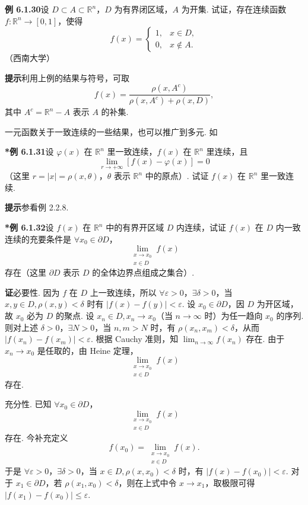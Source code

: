 \documentclass[UTF8,12pt,a4paper,fontset=fandol]{ctexart}
\begin{document}
\noindent\textbf{例 6.1.30}\quad 设 $D\subset A\subset\mathbb{R}^n$，$D$ 为有界闭区域，$A$ 为开集. 试证，存在连续函数 $f:\mathbb{R}^n\to[0,1]$，使得
\[
  f(x)=
  \begin{cases}
  1, & x\in D,\\
  0, & x\notin A.
  \end{cases}
\]
（西南大学）

\noindent\textbf{提示}\quad 利用上例的结果与符号，可取
\[
  f(x)=\frac{\rho(x,A^c)}{\rho(x,A^c)+\rho(x,D)},
\]
其中 $A^c=\mathbb{R}^n-A$ 表示 $A$ 的补集.

一元函数关于一致连续的一些结果，也可以推广到多元. 如

\noindent\textbf{*例 6.1.31}\quad 设 $\varphi(x)$ 在 $\mathbb{R}^n$ 里一致连续，$f(x)$ 在 $\mathbb{R}^n$ 里连续，且
\[
  \lim_{r\to+\infty}[f(x)-\varphi(x)]=0
\]
（这里 $r=|x|=\rho(x,\theta)$，$\theta$ 表示 $\mathbb{R}^n$ 中的原点）. 试证 $f(x)$ 在 $\mathbb{R}^n$ 里一致连续.

\noindent\textbf{提示}\quad 参看例 2.2.8.

\noindent\textbf{*例 6.1.32}\quad 设 $f(x)$ 在 $\mathbb{R}^n$ 中的有界开区域 $D$ 内连续，试证 $f(x)$ 在 $D$ 内一致连续的充要条件是 $\forall x_0\in\partial D$，
\[
  \lim_{\substack{x\to x_0\\ x\in D}}f(x)
\]
存在（这里 $\partial D$ 表示 $D$ 的全体边界点组成之集合）.

\noindent\textbf{证}\quad 必要性. 因为 $f$ 在 $D$ 上一致连续，所以 $\forall\varepsilon>0$，$\exists\delta>0$，当 $x,y\in D,\rho(x,y)<\delta$ 时有 $|f(x)-f(y)|<\varepsilon$. 设 $x_0\in\partial D$，因 $D$ 为开区域，故 $x_0$ 必为 $D$ 的聚点. 设 $x_n\in D,x_n\to x_0$（当 $n\to\infty$ 时）为任一趋向 $x_0$ 的序列. 则对上述 $\delta>0$，$\exists N>0$，当 $n,m>N$ 时，有 $\rho(x_n,x_m)<\delta$，从而 $|f(x_n)-f(x_m)|<\varepsilon$. 根据 Cauchy 准则，知 $\displaystyle\lim_{n\to\infty}f(x_n)$ 存在. 由于 $x_n\to x_0$ 是任取的，由 Heine 定理，
\[
  \lim_{\substack{x\to x_0\\ x\in D}}f(x)
\]
存在.

充分性. 已知 $\forall x_0\in\partial D$，
\[
  \lim_{\substack{x\to x_0\\ x\in D}}f(x)
\]
存在. 今补充定义
\[
  f(x_0)=\lim_{\substack{x\to x_0\\ x\in D}}f(x).
\]
于是 $\forall\varepsilon>0$，$\exists\delta>0$，当 $x\in D,\rho(x,x_0)<\delta$ 时，有 $|f(x)-f(x_0)|<\varepsilon$. 对于 $x_1\in\partial D$，若 $\rho(x_1,x_0)<\delta$，则在上式中令 $x\to x_1$，取极限可得 $|f(x_1)-f(x_0)|\le\varepsilon$.
\end{document}
